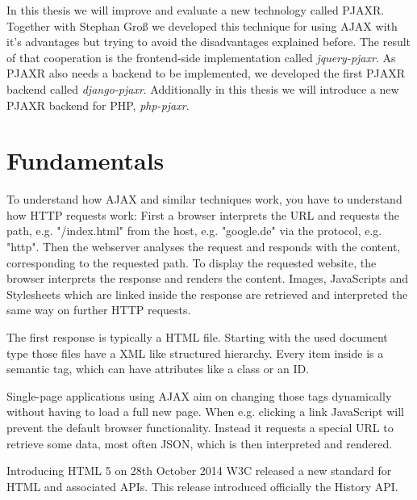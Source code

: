 \documentclass[f,bachelor,binding,twoside,palatino]{WeSTthesis}
\def \ajax {AJAX}
\def \pjaxr {PJAXR}
\def \jqueryPjaxr {jquery-pjaxr}
\def \djangoPjaxr {django-pjaxr}
\def \phpPjaxr {php-pjaxr}
\def \httpRequest {HTTP request}
\def \SinglePageApplication {Single-page application}
\begin{document}
  In this thesis we will improve and evaluate a new technology called \pjaxr{}. 
  Together with Stephan Groß we developed this technique for using \ajax{} with it's advantages but trying to avoid the disadvantages explained before.
  The result of that cooperation is the frontend-side implementation called \emph{\jqueryPjaxr{}}.
  As \pjaxr{} also needs a backend to be implemented, we developed the first \pjaxr{} backend called \emph{\djangoPjaxr{}}.
  Additionally in this thesis we will introduce a new \pjaxr{} backend for PHP, \emph{\phpPjaxr{}}.
  
  
\section{Fundamentals}
  To understand how \ajax{} and similar techniques work, you have to understand how \httpRequest{}s work:
  First a browser interprets the URL and requests the path, e.g. "/index.html" from the host, e.g. "google.de" via the protocol, e.g. "http".
  Then the webserver analyses the request and responds with the content, corresponding to the requested path.
  To display the requested website, the browser interprets the response and renders the content. 
  Images, JavaScripts and Stylesheets which are linked inside the response are retrieved and interpreted the same way on further \httpRequest{}s.

  The first response is typically a HTML file.
  Starting with the used document type those files have a XML like structured hierarchy.
  Every item inside is a semantic tag, which can have attributes like a class or an ID.

  \SinglePageApplication{}s using \ajax{} aim on changing those tags dynamically without having to load a full new page.
  When e.g. clicking a link JavaScript will prevent the default browser functionality. Instead it requests a special URL to retrieve some data, most often JSON, which is then interpreted and rendered.

  Introducing HTML 5 on 28th October 2014 W3C released a new standard for HTML and associated APIs. 
  This release introduced officially the History API.
\end{document}
